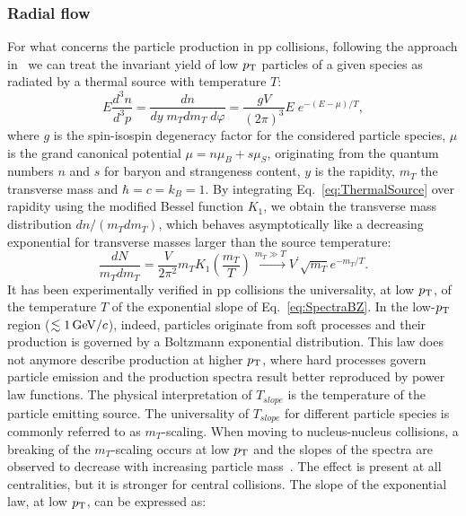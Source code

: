 \subsubsection{Radial flow}
\label{sec:RadialFlow}
For what concerns the particle production in pp collisions, 
following the approach in~\cite{Schnedermann:1993ws} we 
can treat the invariant yield of low $p_{\rm T}$ particles of a given species as radiated by a
 thermal source with temperature $T$:
\begin{equation}
\label{eq:ThermalSource}
E\frac{d^{3}n}{d^3p} = \frac{dn}{dy \; m_{T} dm_T\;d\varphi} = \frac{gV}{(2\pi)^3}E\;e^{-(E-\mu)/T},
\end{equation}
  where $g$ is the spin-isospin degeneracy factor for the considered particle 
  species, $\mu$ is the grand canonical potential $\mu = n\mu_{B}+ s\mu_S$, 
  originating from the quantum numbers $n$ and $s$ for baryon and 
  strangeness content, $y$ is the rapidity, $m_{T}$ the transverse 
  mass and $\hbar = c = k_B = 1$. By integrating Eq.~\ref{eq:ThermalSource}
   over rapidity using the modified Bessel function $K_1$, we obtain
    the transverse mass distribution $dn/(m_Tdm_T)$, which behaves 
    asymptotically like a decreasing exponential for transverse masses 
    larger than the source temperature: 
\begin{equation}
\label{eq:SpectraBZ}
\frac{dN}{m_T dm_T} = \frac{V}{2\pi^2} m_T K_1 (\frac{m_T}{T}) \xrightarrow{m_T \gg T} V^\prime \sqrt{m_T} e^{-m_T/T}.
\end{equation}
It has been experimentally verified in pp collisions the universality, at low $p_{\rm T}$,
of the temperature $T$ of the exponential slope of Eq.~\ref{eq:SpectraBZ}. 
In the low-$p_{\rm T}$ region ($\lesssim 1 \, \mathrm{GeV}/c$), indeed, particles originate from soft processes
and their production is governed by a Boltzmann exponential distribution. 
This law does not anymore describe production at higher $p_{\rm T}$, where hard processes
govern particle emission and the production spectra result better reproduced by power law functions.
 The physical interpretation of $T_{slope}$ is the temperature of the particle
 emitting source. The universality of $T_{slope}$ for different 
 particle species is commonly referred to as $m_{T}$-scaling. When 
 moving to nucleus-nucleus collisions, a breaking of the $m_T$-scaling 
 occurs at low $p_{\rm T}$ and the slopes of the spectra are observed to 
 decrease with increasing particle mass~\cite{Appelshauser:1998yb,Arnaldi:2007ru}.
  The effect is present at all centralities, but it is stronger for central
   collisions. The slope of the exponential law, at low $p_{\rm T}$, can be expressed as:
